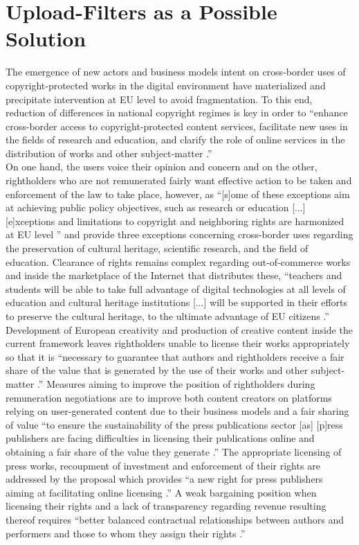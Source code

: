 \documentclass[a4paper]{article}
\begin{document}
\section{Upload-Filters as a Possible Solution}

The emergence of new actors and business models intent on cross-border uses of copyright-protected works in the digital environment have materialized and precipitate intervention at EU level to avoid fragmentation. To this end, reduction of differences in national copyright regimes is key in order to ``enhance cross-border access to copyright-protected content services, facilitate new uses in the fields of research and education, and clarify the role of online services in the distribution of works and other subject-matter \cite{Copyright Reform}.'' \\

\noindent
On one hand, the users voice their opinion and concern and on the other, rightholders who are not remunerated fairly want effective action to be taken and enforcement of the law to take place, however, as ``[s]ome of these exceptions aim at achieving public policy objectives, such as research or education [...] [e]xceptions and limitations to copyright and neighboring rights are harmonized at EU level \cite{Copyright Reform}'' and provide three exceptions concerning cross-border uses regarding the preservation of cultural heritage, scientific research, and the field of education. Clearance of rights remains complex regarding out-of-commerce works and inside the marketplace of the Internet that distributes these, ``teachers and students will be able to take full advantage of digital technologies at all levels of education and cultural heritage institutions [...] will be supported in their efforts to preserve the cultural heritage, to the ultimate advantage of EU citizens \cite{Copyright Reform}.''\\

\noindent
Development of European creativity and production of creative content inside the current framework leaves rightholders unable to license their works appropriately so that it is ``necessary to guarantee that authors and rightholders receive a fair share of the value that is generated by the use of their works and other subject-matter \cite{Copyright Reform}.'' Measures aiming to improve the position of rightholders during remuneration negotiations are to improve both content creators on platforms relying on user-generated content due to their business models and a fair sharing of value ``to ensure the sustainability of the press publications sector [as] [p]ress publishers are facing difficulties in licensing their publications online and obtaining a fair share of the value they generate \cite{Copyright Reform}.'' The appropriate licensing of press works, recoupment of investment and enforcement of their rights are addressed by the proposal which provides ``a new right for press publishers aiming at facilitating online licensing \cite{Copyright Reform}.'' A weak bargaining position when licensing their rights and a lack of transparency regarding revenue resulting thereof requires ``better balanced contractual relationships between authors and performers and those to whom they assign their rights \cite{Copyright Reform}.'' 
\end{document}
